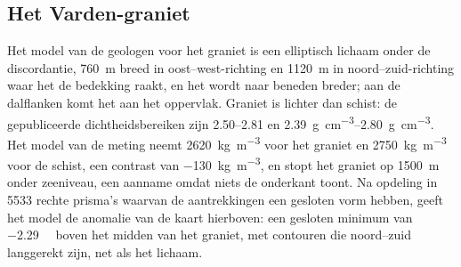 \begin{omfigure}
\par{}\label{fig:b3:field-lab-methods-3:survey}
\end{omfigure}

\subsection{Het Varden-graniet}

Het model van de geologen voor het graniet is een elliptisch lichaam onder de
discordantie, \qty{760}{m} breed in oost--west-richting en \qty{1120}{m} in
noord--zuid-richting waar het de bedekking raakt, en het wordt naar beneden
breder; aan de dalflanken komt het aan het oppervlak. Graniet is lichter dan
schist: de gepubliceerde dichtheidsbereiken zijn \numrange{2.50}{2.81} en
\qtyrange{2.39}{2.80}{g.cm^{-3}}. Het model van de meting neemt
\qty{2620}{kg.m^{-3}} voor het graniet en \qty{2750}{kg.m^{-3}} voor de
schist, een contrast van \qty{-130}{kg.m^{-3}}, en stopt het graniet op
\qty{1500}{m} onder zeeniveau, een aanname omdat niets de onderkant toont.
Na opdeling in \num{5533} rechte prisma's waarvan de aantrekkingen een
gesloten vorm hebben, geeft het model de anomalie van de kaart hierboven: een
gesloten minimum van \qty{-2.29}{\milli\gal} boven het midden van het graniet,
met contouren die noord--zuid langgerekt zijn, net als het lichaam.

